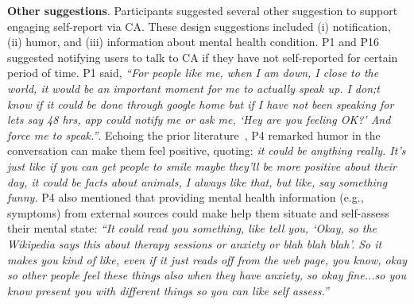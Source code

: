         


    
\textbf{Other suggestions}.
        Participants suggested several other suggestion to support engaging self-report via \ac{CA}. These design suggestions included 
            (i) notification, 
            (ii) humor, and
            (iii) information about mental health condition.
        P1 and P16 suggested notifying users to talk to \ac{CA} if they have not self-reported for certain period of time.
        P1 said,
        \textit{``For people like me, when I am down, I close to the world, it would be an important moment for me to actually speak up. I don;t know if it could be done through google home but if I have not been speaking for lets say 48 hrs, \acl{app} could notify me or ask me, `Hey are you feeling OK?' And force me to speak.''}.
        Echoing the prior literature~\cite{clark2019makes}, P4 remarked humor in the conversation can make them feel positive, quoting:
		\textit{it could be anything really. It's just like if you can get people to smile maybe they'll be more positive about their day, it could be facts about animals, I always like that, but like, say something funny.}
        P4 also mentioned that providing mental health information (e.g., symptoms) from external sources could make help them situate and self-assess their mental state:
        \textit{``It could read you something, like tell you, `Okay, so the Wikipedia says this about therapy sessions or anxiety or blah blah blah'. So it makes you kind of like, even if it just reads off from the web page, you know, okay so other people feel these things also when they have anxiety, so okay fine...so you know present you with different things so you can like self assess.'' }
        
